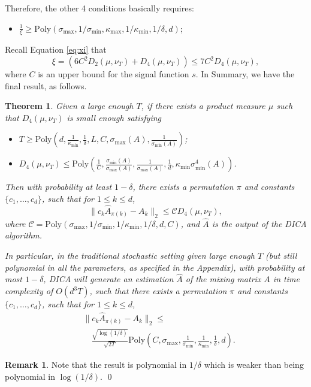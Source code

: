 \documentclass[twoside]{article}
\newtheorem{thm}[lemma]{Theorem}
\theoremstyle{definition}
\newtheorem{remark}[lemma]{Remark}
\begin{document}
Therefore, the other 4 conditions basically requires:
\begin{itemize}
\vspace{-3mm}
\item $\frac{1}{\xi} \ge \text{Poly}(\sigma_{\max}, 1/\sigma_{\min}, \kappa_{\max}, 1/\kappa_{\min},1/\delta, d)$;
\end{itemize} 
\vspace{-2mm}
\fi
Recall Equation \eqref{eq:xi} that 
\[\xi = \left( 6C^2D_2(\mu, \nu_T) + D_4(\mu, \nu_T)\right) \le 7C^2D_4(\mu, \nu_T),\]
where $C$ is an upper bound for the signal function $s$.
In Summary, we have the final result, as follows.
\begin{thm}
\label{thm:finalRes}
 Given a large enough $T$, if there exists a product measure $\mu$  such that  $D_4(\mu, \nu_T)$ is small enough satisfying
\begin{itemize}
\vspace{-3mm}
\item $T \ge \text{Poly}(d, \frac{1}{\kappa_{\min}}, \frac{1}{\delta}, L, C, \sigma_{\max}(A), \frac{1}{\sigma_{\min}(A)})$;
\item $D_4(\mu, \nu_T) \le \text{Poly}(\frac{1}{C},  \frac{\sigma_{\min}(A)}{\sigma_{\max}(A)},  \frac{1}{\sigma_{\max}(A)},\frac{1}{d}, \kappa_{\min}\sigma_{\min}^4(A))$.
\end{itemize}
\vspace{-2mm}
Then with probability at least $1-\delta$, there exists a permutation $\pi$ and constants $\{c_1,\ldots,c_d\}$, such that for $1\le k\le d$,
\[
\| c_k\widehat{A}_{\pi(k)} - A_k\|_2 \le \mathcal{C}D_4(\mu, \nu_T),
\]
where $\mathcal{C} = \text{Poly}(\sigma_{\max}, 1/\sigma_{\min}, 1/\kappa_{\min},1/\delta, d, C)$, and $\widehat{A}$ is the output of the DICA algorithm.

In particular, in the traditional stochastic setting given large enough $T$ (but still polynomial in all the parameters, as specified in the Appendix),
 with probability at most $1-\delta$, 
 DICA will generate an estimation $\widehat{A}$ of the mixing matrix $A$ in
 time complexity of $O(d^3T)$, 
 such that there exists a permutation $\pi$ and constants $\{c_1,\ldots,c_d\}$, such that for $1\le k\le d$,
\begin{align*}
& \| c_k\widehat{A}_{\pi(k)} - A_k\|_2 \le \\
& \quad\frac{\sqrt{\log(1/\delta)}}{\sqrt{2T}}\text{Poly}(C, \sigma_{\max}, \frac{1}{\sigma_{\min}}, \frac{1}{\kappa_{\min}},\frac{1}{\delta}, d).
\end{align*}
\end{thm}
\begin{remark}
Note that the result is polynomial in $1/\delta$ which is weaker than being polynomial in $\log(1/\delta)$. \qed
\end{remark}
\end{document}
